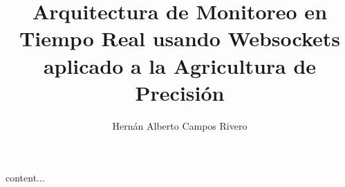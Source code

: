 \documentclass{beamer}
\title{Arquitectura de Monitoreo en Tiempo Real usando Websockets aplicado a la Agricultura de Precisión}
\author{Hernán Alberto Campos Rivero}
\begin{document}
content...
\end{document}
